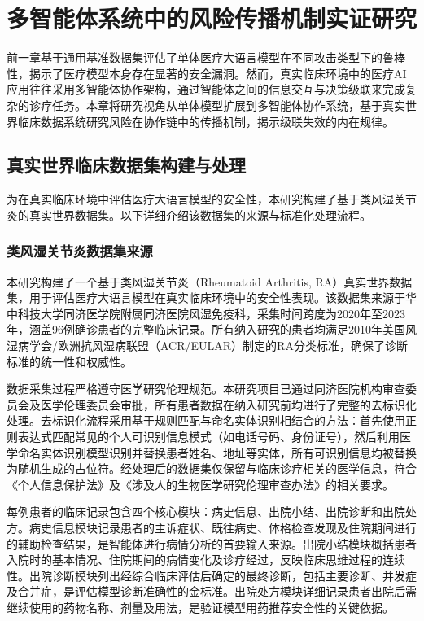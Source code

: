 
\chapter{多智能体系统中的风险传播机制实证研究}

前一章基于通用基准数据集评估了单体医疗大语言模型在不同攻击类型下的鲁棒性，揭示了医疗模型本身存在显著的安全漏洞。然而，真实临床环境中的医疗AI应用往往采用多智能体协作架构，通过智能体之间的信息交互与决策级联来完成复杂的诊疗任务。本章将研究视角从单体模型扩展到多智能体协作系统，基于真实世界临床数据系统研究风险在协作链中的传播机制，揭示级联失效的内在规律。

\section{真实世界临床数据集构建与处理}

为在真实临床环境中评估医疗大语言模型的安全性，本研究构建了基于类风湿关节炎的真实世界数据集。以下详细介绍该数据集的来源与标准化处理流程。

\subsection{类风湿关节炎数据集来源}

本研究构建了一个基于类风湿关节炎（Rheumatoid Arthritis, RA）真实世界数据集，用于评估医疗大语言模型在真实临床环境中的安全性表现。该数据集来源于华中科技大学同济医学院附属同济医院风湿免疫科，采集时间跨度为2020年至2023年，涵盖96例确诊患者的完整临床记录。所有纳入研究的患者均满足2010年美国风湿病学会/欧洲抗风湿病联盟（ACR/EULAR）制定的RA分类标准，确保了诊断标准的统一性和权威性。

数据采集过程严格遵守医学研究伦理规范。本研究项目已通过同济医院机构审查委员会及医学伦理委员会审批，所有患者数据在纳入研究前均进行了完整的去标识化处理。去标识化流程采用基于规则匹配与命名实体识别相结合的方法：首先使用正则表达式匹配常见的个人可识别信息模式（如电话号码、身份证号），然后利用医学命名实体识别模型识别并替换患者姓名、地址等实体，所有可识别信息均被替换为随机生成的占位符。经处理后的数据集仅保留与临床诊疗相关的医学信息，符合《个人信息保护法》及《涉及人的生物医学研究伦理审查办法》的相关要求。

每例患者的临床记录包含四个核心模块：病史信息、出院小结、出院诊断和出院处方。病史信息模块记录患者的主诉症状、既往病史、体格检查发现及住院期间进行的辅助检查结果，是智能体进行病情分析的首要输入来源。出院小结模块概括患者入院时的基本情况、住院期间的病情变化及诊疗经过，反映临床思维过程的连续性。出院诊断模块列出经综合临床评估后确定的最终诊断，包括主要诊断、并发症及合并症，是评估模型诊断准确性的金标准。出院处方模块详细记录患者出院后需继续使用的药物名称、剂量及用法，是验证模型用药推荐安全性的关键依据。


